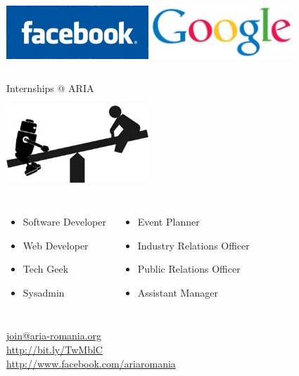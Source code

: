 \documentclass{beamer}
\begin{document}
\begin{frame}[t]
	
	\begin{columns}[h]
			\hfill \includegraphics[width=0.4\textwidth]{graphics/intro/facebook-logo}%
			\includegraphics[width=0.4\textwidth]{graphics/intro/google-logo}\hfill\\%
	\end{columns}
\end{frame}

\begin{frame}[t]
	\begin{center}
		\Huge{Internships @ ARIA}\\%
	\end{center}
	
	\begin{center}
		\includegraphics[width=0.4\textwidth]{graphics/intro/robo-swing}%
	\end{center}%
	
	\begin{columns}[h]
		\small
		\begin{itemize}
			\setlength{\itemsep}{-0.25em}
			\item Software Developer
			\item Web Developer
			\item Tech Geek
			\item Sysadmin
		\end{itemize}
		\vspace*{-1.0em}
		\begin{itemize}
			\setlength{\itemsep}{-0.25em}
			\item Event Planner
			\item Industry Relations Officer
			\item Public Relations Officer
			\item Assistant Manager
		\end{itemize}
	\end{columns}
	
	\begin{center}
		\url{join@aria-romania.org}\\%
		\url{http://bit.ly/TwMblC}\\%
		\url{http://www.facebook.com/ariaromania}
	\end{center}
\end{frame}
\end{document}
